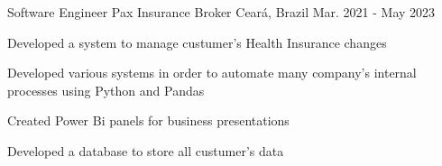 \begin{cventries}
  \cventry
    {Software Engineer} %
    {Pax Insurance Broker} %
    {Ceará, Brazil} %
    {Mar. 2021 - May 2023} %
    {
      \begin{cvitems} %
        \item {Developed a system to manage custumer's Health Insurance changes}
        \item {Developed various systems in order to automate many company's internal processes using Python and Pandas}
        \item {Created Power Bi panels for business presentations}
        \item {Developed a database to store
        all custumer's data}
      \end{cvitems}
  }

\end{cventries}
